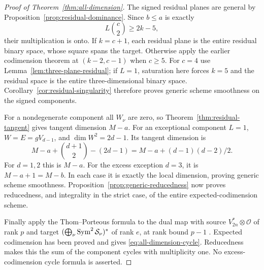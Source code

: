 \begin{proof}[Proof of Theorem~\ref{thm:all-dimension}]
The signed residual planes are general by
Proposition~\ref{prop:residual-dominance}. Since $b\le a$ is exactly
\[
 L\binom c2\ge2k-5,
\]
their multiplication is onto. If $k=c+1$, each residual plane is the
entire residual binary space, whose square spans the target. Otherwise
apply the earlier codimension theorem at $(k-2,c-1)$ when $c\ge5$.
For $c=4$ use
Lemma~\ref{lem:three-plane-residual}; if $L=1$, saturation here forces
$k=5$ and the residual space is the entire three-dimensional binary
space. Corollary~\ref{cor:residual-singularity} therefore proves
generic scheme smoothness on the signed components.

For a nondegenerate component all $W_\nu$ are zero, so
Theorem~\ref{thm:residual-tangent} gives tangent dimension $M-a$.
For an exceptional component $L=1$, $W=E=gV_{d-1}$, and
$\dim W^2=2d-1$. Its tangent dimension is
\[
 M-a+\binom{d+1}{2}-(2d-1)
   =M-a+(d-1)(d-2)/2.
\]
For $d=1,2$ this is $M-a$. For the excess exception $d=3$, it is
$M-a+1=M-b$. In each case it is exactly the local dimension, proving
generic scheme smoothness. Proposition~\ref{prop:generic-reducedness}
now proves reducedness, and integrality in the strict case, of the
entire expected-codimension scheme.

Finally apply the Thom--Porteous formula to the dual map with source
$V_{2n}^*\otimes\mathcal O$ of rank $p$ and target
$(\bigoplus_\nu\operatorname{Sym}^2\mathcal S_\nu)^*$ of rank $e$, at rank bound
$p-1$ \cite{KL,Fulton}. Expected codimension has been proved and gives
\eqref{eq:all-dimension-cycle}. Reducedness makes this the sum of the
component cycles with multiplicity one. No excess-codimension cycle
formula is asserted.
\end{proof}
